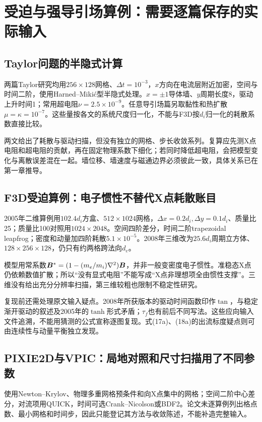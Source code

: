 \section{受迫与强导引场算例：需要逐篇保存的实际输入}
\subsection{Taylor问题的半隐式计算}
两篇Taylor研究均用$256\times128$网格、$\Delta t=10^{-3}$，$x$方向在电流层附近加密，空间与时间二阶，使用Harned--Miki\'c型半隐式处理。$x=\pm1$导体墙、$y$周期长度8，驱动上升时间1；常用超电阻$\nu=2.5\times10^{-9}$。任意导引场篇另取黏性和热扩散$\mu=\kappa=10^{-7}$。这些量按各文的系统尺度归一化，不能与F3D按$d_i$归一化的耗散系数直接比较。\citep{L057,L058}

两文给出了耗散与驱动扫描，但没有独立的网格、步长收敛系列。复算应先测X点电阻和超电阻的贡献，再在固定物理系数下细化；若同时降低超电阻，会把模型变化与离散误差混在一起。墙位移、墙速度与磁通边界必须彼此一致，具体关系已在第一章推导。

\subsection{F3D受迫算例：电子惯性不替代X点耗散账目}
2005年二维算例用$102.4d_i$方盒、$512\times1024$网格，$\Delta x=0.2d_i,\Delta y=0.1d_i$、质量比25；质量比100对照用$1024\times2048$。空间四阶差分，时间二阶trapezoidal leapfrog；密度和动量加四阶耗散$5.1\times10^{-5}$。2008年三维改为$25.6d_i$周期立方体、$128\times256\times128$，仍只有约两格跨法向$d_e$。\citep{L076,F717}

模型用常系数$\bm{B}^*=(1-(m_e/m_i)\nabla^2)\bm{B}$，并非一般变密度电子惯性。准稳态X点仍依赖数值扩散；所以“没有显式电阻”不能写成“X点非理想项全由惯性支撑”。三维没有给出充分分辨率扫描，第三维较粗也限制不稳定性研究。

复现前还需处理原文输入疑点。2008年所获版本的驱动时间函数印作$\tan$，与稳定渐开驱动的叙述及2005年的$\tanh$形式矛盾；$\tau_f$也有前后不同写法。这些应向输入文件追溯，不能用猜测的公式宣称逐图复现。式(17a)、(18a)的出流标度疑点则可由连续性与动量平衡独立发现。

\subsection{PIXIE2D与VPIC：局地对照和尺寸扫描用了不同参数}
\citet{L217}使用Newton--Krylov、物理多重网格预条件和向X点集中的网格；空间二阶中心差分，对流项用QUICK，时间可选Crank--Nicolson或BDF2。论文未逐算例列出格点数、最小网格和时间步，因此只能登记其方法与收敛陈述，不能补造完整输入。

